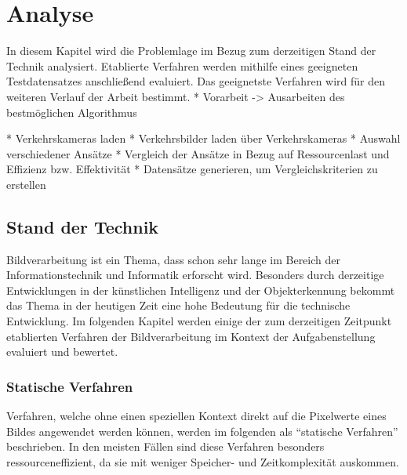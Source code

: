 \chapter{Analyse}
In diesem Kapitel wird die Problemlage im Bezug zum derzeitigen Stand der Technik analysiert.
Etablierte Verfahren werden mithilfe eines geeigneten Testdatensatzes anschließend evaluiert.
Das geeignetste Verfahren wird für den weiteren Verlauf der Arbeit bestimmt.
* Vorarbeit -> Ausarbeiten des bestmöglichen Algorithmus\newline

* Verkehrskameras laden\newline
* Verkehrsbilder laden über Verkehrskameras\newline
* Auswahl verschiedener Ansätze\newline
* Vergleich der Ansätze in Bezug auf Ressourcenlast und Effizienz bzw. Effektivität\newline
* Datensätze generieren, um Vergleichskriterien zu erstellen\newline

\section{Stand der Technik}
Bildverarbeitung ist ein Thema, dass schon sehr lange im Bereich der Informationstechnik und Informatik erforscht wird.
Besonders durch derzeitige Entwicklungen in der künstlichen Intelligenz und der Objekterkennung bekommt das Thema in der heutigen Zeit eine hohe Bedeutung für die technische Entwicklung. Im folgenden Kapitel werden einige der zum derzeitigen Zeitpunkt etablierten Verfahren der Bildverarbeitung im Kontext der Aufgabenstellung evaluiert und bewertet.

\subsection{Statische Verfahren}
Verfahren, welche ohne einen speziellen Kontext direkt auf die Pixelwerte eines Bildes angewendet werden können, werden im folgenden als "`statische Verfahren"' beschrieben. In den meisten Fällen sind diese Verfahren besonders ressourceneffizient, da sie mit weniger Speicher- und Zeitkomplexität auskommen.

